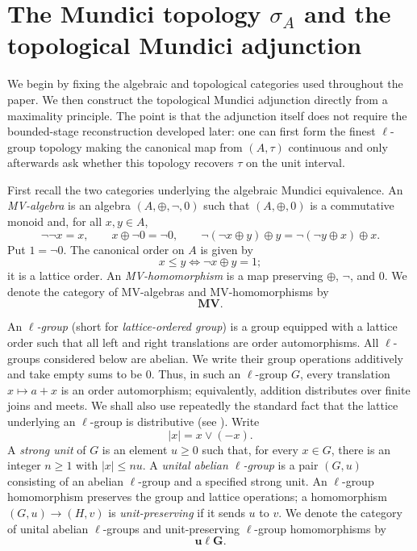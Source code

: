\documentclass[preprint,3p]{elsarticle}
\theoremstyle{plain}
\theoremstyle{definition}
\newcommand{\uLG}{\mathbf{u\ell G}}
\newcommand{\MV}{\mathbf{MV}}
\numberwithin{equation}{section}
\begin{document}
\section{The Mundici topology \texorpdfstring{$\sigma_A$}{sigma\_A}
and the topological Mundici adjunction}
\label{sec-adjunction}

We begin by fixing the algebraic and topological categories used throughout
the paper.  We then construct the topological Mundici adjunction directly
from a maximality principle.  The point is that the adjunction itself does
not require the bounded-stage reconstruction developed later: one can first
form the finest $\ell$-group topology making the canonical map from
$(A,\tau)$ continuous and only afterwards ask whether this topology recovers
$\tau$ on the unit interval.

First recall the two categories underlying the algebraic Mundici
equivalence.  An \emph{MV-algebra} \cite{Chang1958,Cignoli2000a,Mundici2011} 
is an algebra $(A,\oplus,\neg,0)$ such that $(A,\oplus,0)$ is 
a commutative monoid and, for all $x,y\in A$,
\[
 \neg\neg x=x,\qquad x\oplus\neg0=\neg0,
 \qquad
 \neg(\neg x\oplus y)\oplus y
 =\neg(\neg y\oplus x)\oplus x.
\]
Put $1=\neg0$.  The canonical order on $A$ is given by
\[
 x\leq y\iff \neg x\oplus y=1;
\]
it is a lattice order.  An \emph{MV-homomorphism} is a map preserving
$\oplus$, $\neg$, and $0$.  We denote the category of MV-algebras and
MV-homomorphisms by 
\[
\MV.
\] 

An \emph{$\ell$-group} (short for \emph{lattice-ordered group})
\cite{Birkhoff1942,Birkhoff1967,Darnel1994,Kopytov1994} is a group equipped with a
lattice order such that all left and right translations are order
automorphisms.  All $\ell$-groups considered below are abelian.
We write their group operations additively and take empty sums to be $0$.
Thus, in such an $\ell$-group $G$, 
every translation
$x\mapsto a+x$ is an order automorphism; equivalently, addition
distributes over finite joins and meets.  We shall also use repeatedly
the standard fact that the lattice underlying an $\ell$-group is
distributive (see \cite[Section~2.2, Proposition~2]{Kopytov1994}).
Write 
\[
 |x|=x\vee(-x).
\]
A \emph{strong unit} of $G$ is an element $u\geq0$ such
that, for every $x\in G$, there is an integer $n\geq1$ with
$|x|\leq nu$.  A \emph{unital abelian $\ell$-group} is a pair $(G,u)$
consisting of an abelian $\ell$-group and a specified strong unit.  An
$\ell$-group homomorphism preserves the group and lattice operations; a
homomorphism $(G,u)\longrightarrow(H,v)$ is \emph{unit-preserving} if it
sends $u$ to $v$.  We denote the category of unital abelian $\ell$-groups
and unit-preserving $\ell$-group homomorphisms by 
\[
\uLG.
\]
\end{document}
